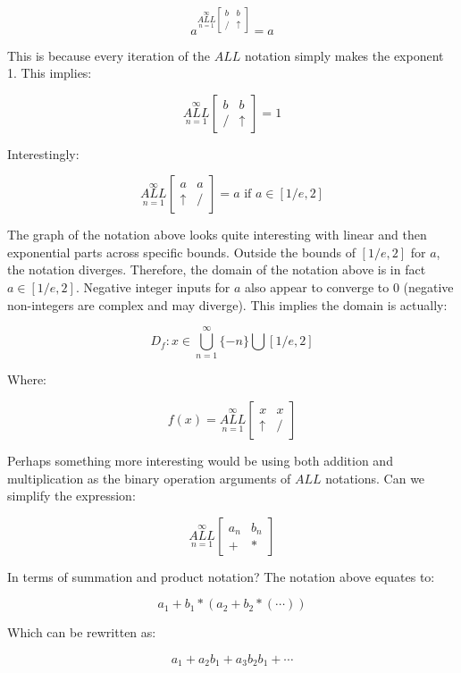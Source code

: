 \documentclass{article}
\begin{document}
$$a^{\underset{n=1}{\overset{\infty}{ALL}} \begin{bmatrix}
b & b \\
/ & \uparrow
\end{bmatrix}} = a$$

This is because every iteration of the $ALL$ notation simply makes the exponent 1. This implies:

$$\underset{n=1}{\overset{\infty}{ALL}} \begin{bmatrix}
b & b \\
/ & \uparrow
\end{bmatrix}=1$$

Interestingly:

$$\underset{n=1}{\overset{\infty}{ALL}} \begin{bmatrix}
a & a \\
\uparrow & /
\end{bmatrix} =a\text{ if }a\in[1/e,2]$$

The graph of the notation above looks quite interesting with linear and then exponential parts across specific bounds. Outside the bounds of $[1/e,2]$ for $a$, the notation diverges. Therefore, the domain of the notation above is in fact $a\in[1/e,2]$. Negative integer inputs for $a$ also appear to converge to 0 (negative non-integers are complex and may diverge). This implies the domain is actually:

$$D_f: x\in \underset{n=1}{\overset{\infty}{\bigcup}}\{-n\} \bigcup [1/e,2] $$

Where:

$$f(x)=\underset{n=1}{\overset{\infty}{ALL}} \begin{bmatrix}
x & x \\
\uparrow & /
\end{bmatrix}$$

Perhaps something more interesting would be using both addition and multiplication as the binary operation arguments of $ALL$ notations. Can we simplify the expression:

$$\underset{n=1}{\overset{\infty}{ALL}} \begin{bmatrix}
a_n & b_n \\
+ & *
\end{bmatrix}$$

In terms of summation and product notation? The notation above equates to:

$$a_1+b_1*(a_2+b_2*(\cdots))$$

Which can be rewritten as:

$$a_1+a_2b_1+a_3b_2b_1+\cdots$$
\end{document}
